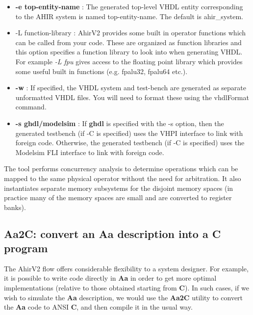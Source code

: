 \begin{itemize}
(an integer $\geq 1$),
the user can trade-off clock cycles versus clock period.  
The lowest clock period will be obtained for -S 1.   
\item {\bf -e top-entity-name} : The generated top-level VHDL entity
corresponding to the AHIR system is named top-entity-name.  The default
is ahir\_system.
\item {-L function-library} : AhirV2 provides some built in operator
functions which can be called from your code.  These are organized
as function libraries and this option specifies a function library
to look into when generating VHDL.  For example {\em -L fpu} gives
access to the floating point library which provides some useful
built in functions (e.g. fpalu32, fpalu64 etc.).
\item {\bf -w} :  If specified, the VHDL system and test-bench are
generated as separate unformatted VHDL files.  You will need to
format these using the vhdlFormat command.
\item {\bf -s ghdl/modelsim} :  If {\bf ghdl} is specified
with the -s option, then the generated testbench (if -C is specified)
uses the VHPI interface to link with foreign code.  Otherwise,
the generated testbench (if -C is specified) uses the Modelsim FLI
interface to link with foreign code.
\end{itemize}

The tool performs concurrency analysis to determine operations which
can be mapped to the same physical operator without the need for
arbitration.  It also instantiates separate memory subsystems for
the disjoint memory spaces (in practice many of the memory spaces
are small and are converted to register banks).


\subsection{{\bf Aa2C}: convert an {\bf Aa} description into a {\bf C} program}

The AhirV2 flow offers considerable flexibility to a system designer.
For example, it is possible to write code directly in {\bf Aa} in order
to get more optimal implementations (relative to those obtained 
starting from {\bf C}).  In such cases, if we wish to simulate
the {\bf Aa} description, we would use the {\bf Aa2C} utility to
convert the {\bf Aa} code to ANSI {\bf C}, and then compile it
in the usual way.

